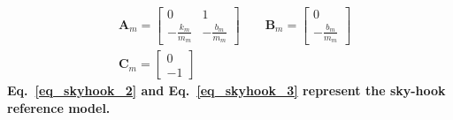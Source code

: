 \documentclass[12pt,a4paper,oneside]{book}
\begin{document}
\begin{onehalfspace}
\begin{mybox}
\begin{equation}
\begin{aligned}
			&\mathbf{A}_m = \begin{bmatrix} 0 & 1 \\[6pt] -\frac{k_m}{m_m} & -\frac{b_m}{m_m} \end{bmatrix}\qquad \mathbf{B}_m = \begin{bmatrix} 0 \\[6pt] -\frac{b_m}{m_m} \end{bmatrix} \\[6pt] &\mathbf{C}_m =\begin{bmatrix} 0 \\[6pt] -1 \end{bmatrix}
		\end{aligned}
	\end{equation} 
	\textbf{Eq.~\ref{eq_skyhook_2} and Eq.~\ref{eq_skyhook_3} represent the sky-hook reference model.}
\end{mybox}


\end{onehalfspace}
\end{document}
